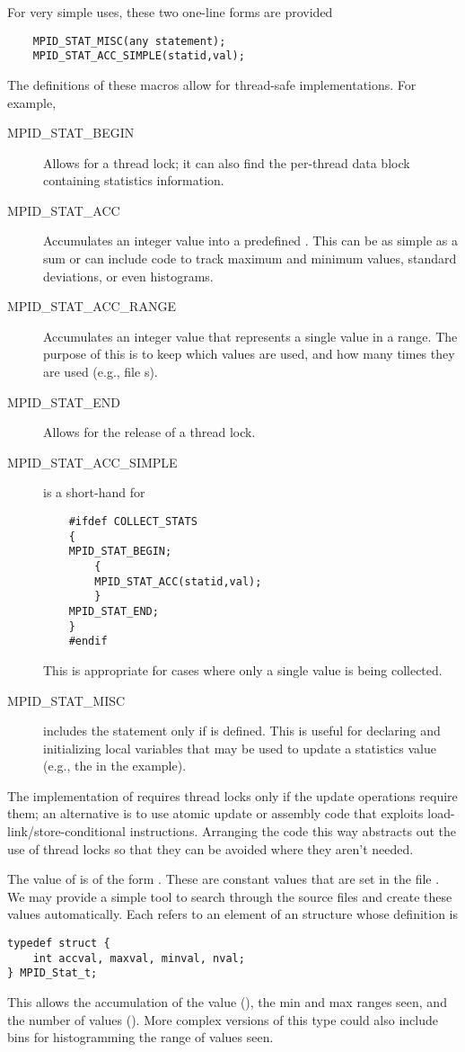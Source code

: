 \documentclass{article}
\begin{document}
For very simple uses, these two one-line forms are provided
\begin{verbatim}
    MPID_STAT_MISC(any statement);
    MPID_STAT_ACC_SIMPLE(statid,val);
\end{verbatim}

The definitions of these macros allow for thread-safe
implementations.  For example,
\begin{description}
\item[MPID_STAT_BEGIN]Allows for a thread lock; it can also find the 
per-thread data block containing statistics information. 
\item[MPID_STAT_ACC]Accumulates an integer value into a predefined
.  This can be as simple as a sum or can include code to
track maximum and minimum values, standard deviations, or even
histograms. 
\item[MPID_STAT_ACC_RANGE]Accumulates an integer value that
represents a single value in a range.  The purpose of this is to keep
which values are used, and how many times they are used (e.g.,
file s).
\item[MPID_STAT_END]Allows for the release of a thread lock.
\item[MPID_STAT_ACC_SIMPLE]is a short-hand for 
\begin{verbatim}
    #ifdef COLLECT_STATS
    {
    MPID_STAT_BEGIN;
        {
        MPID_STAT_ACC(statid,val);
        }
    MPID_STAT_END;
    }
    #endif
\end{verbatim}
This is appropriate for cases where only a single value is being
collected.
\item[MPID_STAT_MISC]includes the statement only if
 is defined.  This is useful for declaring and
initializing local variables that may be used to update a statistics
value (e.g., the  in the example).
\end{description}

The implementation of  requires thread locks
only if the update operations require 
them; an alternative is to use atomic update or assembly code that
exploits load-link/store-conditional instructions.  Arranging the code
this way abstracts out the use of thread locks so that they can be
avoided where they aren't needed.

The value of  is of the form .  These are
constant values that are set in the file .  We may provide a
simple tool to search through the source files and create these values
automatically.  Each  refers to an element of an
 structure whose definition is
\begin{verbatim}
typedef struct {
    int accval, maxval, minval, nval;
} MPID_Stat_t;
\end{verbatim}
This allows the accumulation of the value (), the min and max
ranges seen, and the number of values ().  More complex versions of
this type could also include bins for histogramming the range of values seen.
\end{document}
